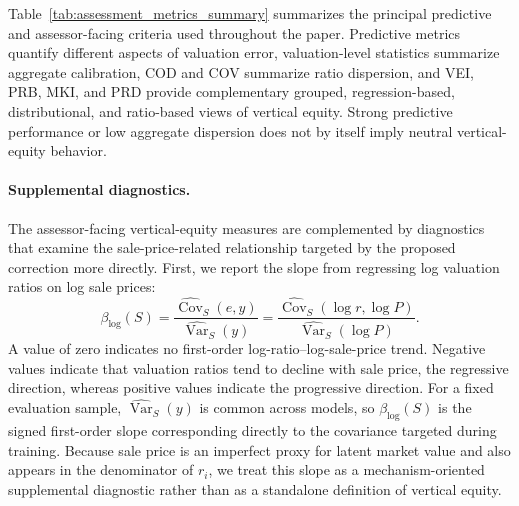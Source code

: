 \documentclass[10pt]{article}
\theoremstyle{definition}
\newcommand{\1}{\mathbf{1}}
\begin{document}

{Table~\ref{tab:assessment_metrics_summary} summarizes the principal predictive and assessor-facing criteria used throughout the paper. Predictive metrics quantify different aspects of valuation error, valuation-level statistics summarize aggregate calibration, COD and COV summarize ratio dispersion, and VEI, PRB, MKI, and PRD provide complementary grouped, regression-based, distributional, and ratio-based views of vertical equity. Strong predictive performance or low aggregate dispersion does not by itself imply neutral vertical-equity behavior.}


\paragraph{Supplemental diagnostics.}
{The assessor-facing vertical-equity measures are complemented by diagnostics that examine the sale-price-related relationship targeted by the proposed correction more directly. First, we report the slope from regressing log valuation ratios on log sale prices:}
\begin{equation}
\label{eq:log_ratio_slope}
\beta_{\log}(S)
=
\frac{
\widehat{\operatorname{Cov}}_S(e,y)
}{
\widehat{\operatorname{Var}}_S(y)
}
=
\frac{
\widehat{\operatorname{Cov}}_S(\log r,\log P)
}{
\widehat{\operatorname{Var}}_S(\log P)
}.
\end{equation}
{A value of zero indicates no first-order log-ratio--log-sale-price trend. Negative values indicate that valuation ratios tend to decline with sale price, the regressive direction, whereas positive values indicate the progressive direction. For a fixed evaluation sample, $\widehat{\operatorname{Var}}_S(y)$ is common across models, so $\beta_{\log}(S)$ is the signed first-order slope corresponding directly to the covariance targeted during training. Because sale price is an imperfect proxy for latent market value and also appears in the denominator of $r_i$, we treat this slope as a mechanism-oriented supplemental diagnostic rather than as a standalone definition of vertical equity.}
\end{document}
